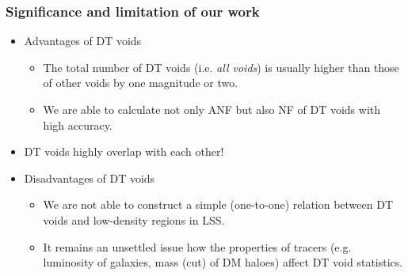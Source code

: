 \documentclass{beamer}
\newtheorem{Narrow down the analysis}{Narrow down the analysis}
\begin{document}
\begin{frame}
	\frametitle{Significance and limitation of our work}
	\begin{itemize}
	\pause \item Advantages of DT voids
		\begin{itemize}
		\pause \item The total number of DT voids (i.e. \textit{all voids}) is usually higher than those of other voids by one magnitude or two.
		\pause \item We are able to calculate not only ANF but also NF of DT voids with high accuracy.
		\end{itemize}
	\pause \item[\checkmark] DT voids highly overlap with each other!
	\pause \item Disadvantages of DT voids
		\begin{itemize}
		\pause \item We are not able to construct a simple (one-to-one) relation between DT voids and low-density regions in LSS. 
		 \pause \item It remains an unsettled issue how the properties of tracers (e.g. luminosity of galaxies, mass (cut) of DM haloes) affect DT void statistics.
		\end{itemize}
	\end{itemize}
\end{frame}
\end{document}

